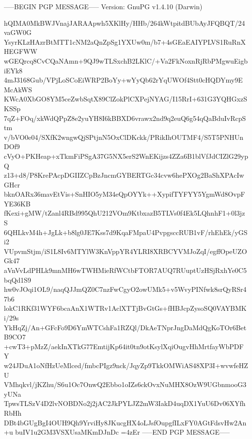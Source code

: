 -----BEGIN PGP MESSAGE-----
Version: GnuPG v1.4.10 (Darwin)

hQIMA0MkBWJVnajJARAApwh5XKlHy/HHb/264kWtpitdBUbAyJFQBQT/24vaGW0G
YsyrKLzHAzrBtMTT1cNM2aQnZpSg1YXUw0m/b7+4sGEaEAIYPLVS1RuRnXHEGFWW
wGEQrcq8CvCQaNAmn+9QJ9wTLSxchB2LKlC/+Va2FkNoxnRjRbPMgwuEigbiEYk8
4mJ3168Gub/VPjLoSCoEiWRP2BoYy+wYyQb62rYqUWOf4Stt0cHQDYmy9EMcAkWS
KWcA0XbGO8YM5ceZwbSqtX89ClZokPlCXPejNYAG/I15RrI+631G3YQHGxzSKSSp
7qZ+FOq/xkWdQPpZ8e2yuYH8I6kBBXD6vrawx2nd9q2euQ6g54qQaBduIvRcpStm
v/bVO0e04/SXfK2wngwQjSPtjnN5OxClDKckk/PRikIhOUTMF4/S5T5PNHUnDOf9
cVyO+PKHeap+xTkmFiPSgA37G5NX5erS2WnEKijzs4ZZa6B1blVfJdCIZlG29ypQ
z13+d8/P8KrePAcpDGIIZCpBzJncmGYBERTGc34cvw6hePXOg2BaShXPAcIwGHcr
bknOARx36mavEtVis+SnHIO5yM34eQpOYYk++XypifTYFYY5YgmWd8OvpFYE36KB
fKexi+gMW/tZanl4RBd995QhU212VOm9KtbxazB5TLVs0f4Ek5LQhnhF1+0l3jzS
6QHLkvM4h+JgLk+b8lg0JE7Kss7d9KqaFMpaU4PvpgsccRUB1vF/rhEhEk/yGSi2
VUpvmStjm/iS1L8Iv6MTYlW3KnVppYR4YLRI8XRBCYVMJoZqI/egffOpeUZOGk47
aVnVvLdPHLk9mnMH6wTWHMieRfWCtbFTOR7AUQ7RUuptUzHSjRxhYe0C5bqQd1S9
hw0vJOqi1OL9/naqQJJmQZ0C7nzFwCgyO2owUMk5+v5WvyPINfwk8srQyRSr47b6
lokC1RKf31WYF6bcaAnX1WTRv1AclXTTjBvGtGs+fHBJcpZysoSQ0VAYBMKi/29s
YkHqZj/An+GFcFo9D6YmWTCshFa1RZQl/DkAeTNprJngDaMdQgKoTOr6BetB9CO7
+cwT3+pMzZ/aekInXTkG77EmtijKp64it0tn9otKsylXqiOugvHhMrtfayWbPDFY
w24JDuA1oNfHzUeMlced/fmbcPIgz9nck/JqyZp9TkkOMWiAS48XP3I+wvwfeHZU
VMhqkvl/jKZhu/S6u1Oc7OnwQ2Ebbo1oIZs6ckOvxNuMHX8OzW9UGbnmooG3yUNa
TpwsTLSzV4D2lvNOBDNo2j2jAC2JkPYLJZ2mW3IakD4uqDX1YuU6Dv06XYfhRbHh
DBt4bGUgBgI4OUH9Qh9YrviHy8JKucgHX4oLJsfOupgfILxFY0AGtFdsvHw2An+u
buIV1u2GM3VSXUsaMKmDJnDc
=4zEr
-----END PGP MESSAGE-----

